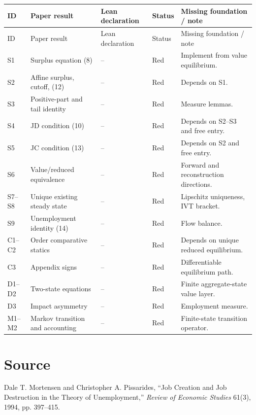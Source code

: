 \documentclass[11pt]{article}
\begin{document}
\small
\begin{longtable}{>{\raggedright\arraybackslash}p{} >{\raggedright\arraybackslash}p{} >{\raggedright\arraybackslash}p{} >{\raggedright\arraybackslash}p{} >{\raggedright\arraybackslash}p{}}
\toprule
ID & Paper result & Lean declaration & Status & Missing foundation / note \\
\midrule
\endfirsthead
\toprule
ID & Paper result & Lean declaration & Status & Missing foundation / note \\
\midrule
\endhead
S1 & Surplus equation (8) & -- & Red & Implement from value equilibrium. \\
S2 & Affine surplus, cutoff, (12) & -- & Red & Depends on S1. \\
S3 & Positive-part and tail identity & -- & Red & Measure lemmas. \\
S4 & JD condition (10) & -- & Red & Depends on S2--S3 and free entry. \\
S5 & JC condition (13) & -- & Red & Depends on S2 and free entry. \\
S6 & Value/reduced equivalence & -- & Red & Forward and reconstruction directions. \\
S7--S8 & Unique existing steady state & -- & Red & Lipschitz uniqueness, IVT bracket. \\
S9 & Unemployment identity (14) & -- & Red & Flow balance. \\
C1--C2 & Order comparative statics & -- & Red & Depends on unique reduced equilibrium. \\
C3 & Appendix signs & -- & Red & Differentiable equilibrium path. \\
D1--D2 & Two-state equations & -- & Red & Finite aggregate-state value layer. \\
D3 & Impact asymmetry & -- & Red & Employment measure. \\
M1--M2 & Markov transition and accounting & -- & Red & Finite-state transition operator. \\
\bottomrule
\end{longtable}
\normalsize

\section*{Source}
Dale T. Mortensen and Christopher A. Pissarides, ``Job Creation and Job Destruction in the Theory of Unemployment,'' \emph{Review of Economic Studies} 61(3), 1994, pp. 397--415.
\end{document}

